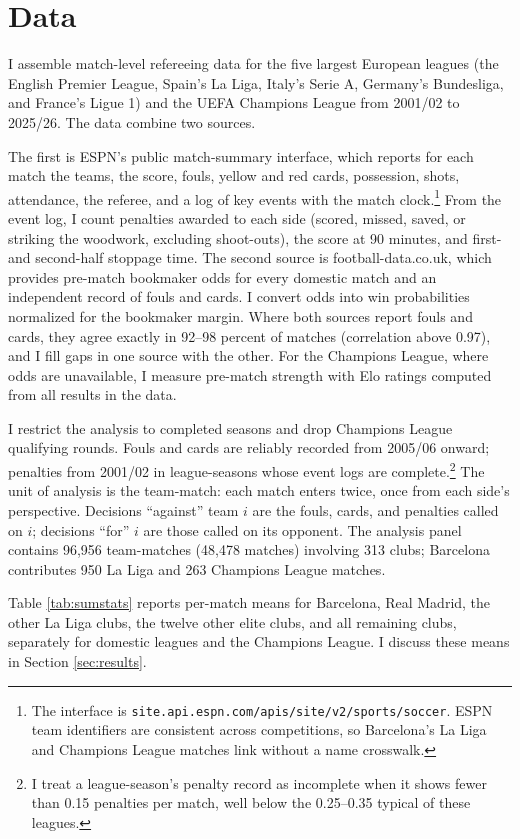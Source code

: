 \section{Data}\label{sec:data}

I assemble match-level refereeing data for the five largest European leagues (the English Premier League, Spain's La Liga, Italy's Serie A, Germany's Bundesliga, and France's Ligue 1) and the UEFA Champions League from 2001/02 to 2025/26. The data combine two sources.

The first is ESPN's public match-summary interface, which reports for each match the teams, the score, fouls, yellow and red cards, possession, shots, attendance, the referee, and a log of key events with the match clock.\footnote{The interface is \texttt{site.api.espn.com/apis/site/v2/sports/soccer}. ESPN team identifiers are consistent across competitions, so Barcelona's La Liga and Champions League matches link without a name crosswalk.} From the event log, I count penalties awarded to each side (scored, missed, saved, or striking the woodwork, excluding shoot-outs), the score at 90 minutes, and first- and second-half stoppage time. The second source is football-data.co.uk, which provides pre-match bookmaker odds for every domestic match and an independent record of fouls and cards. I convert odds into win probabilities normalized for the bookmaker margin. Where both sources report fouls and cards, they agree exactly in 92--98 percent of matches (correlation above 0.97), and I fill gaps in one source with the other. For the Champions League, where odds are unavailable, I measure pre-match strength with Elo ratings computed from all results in the data.

I restrict the analysis to completed seasons and drop Champions League qualifying rounds. Fouls and cards are reliably recorded from 2005/06 onward; penalties from 2001/02 in league-seasons whose event logs are complete.\footnote{I treat a league-season's penalty record as incomplete when it shows fewer than 0.15 penalties per match, well below the 0.25--0.35 typical of these leagues.} The unit of analysis is the team-match: each match enters twice, once from each side's perspective. Decisions ``against'' team $i$ are the fouls, cards, and penalties called on $i$; decisions ``for'' $i$ are those called on its opponent. The analysis panel contains 96,956 team-matches (48,478 matches) involving 313 clubs; Barcelona contributes 950 La Liga and 263 Champions League matches.

Table \ref{tab:sumstats} reports per-match means for Barcelona, Real Madrid, the other La Liga clubs, the twelve other elite clubs, and all remaining clubs, separately for domestic leagues and the Champions League. I discuss these means in Section \ref{sec:results}.
